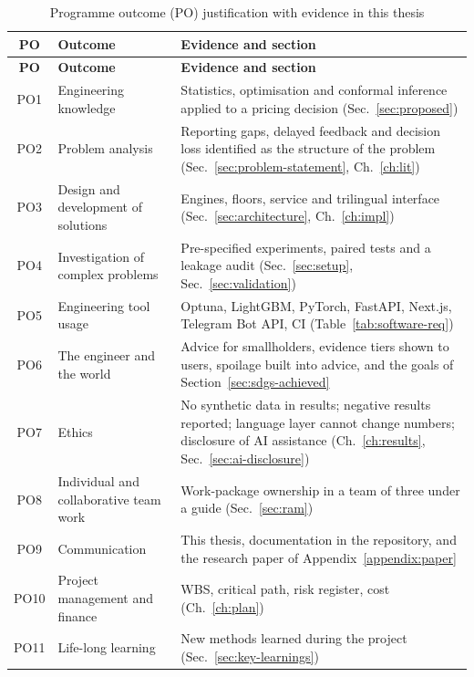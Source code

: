 {\small
\begin{longtable}{|c|p{4.6cm}|p{7.6cm}|}
\caption{Programme outcome (PO) justification with evidence in this thesis}\label{tab:po}\\
\hline
\textbf{PO} & \textbf{Outcome} & \textbf{Evidence and section} \\ \hline
\endfirsthead
\hline
\textbf{PO} & \textbf{Outcome} & \textbf{Evidence and section} \\ \hline
\endhead
PO1 & Engineering knowledge & Statistics, optimisation and conformal inference applied to a pricing decision (Sec.~\ref{sec:proposed}) \\ \hline
PO2 & Problem analysis & Reporting gaps, delayed feedback and decision loss identified as the structure of the problem (Sec.~\ref{sec:problem-statement}, Ch.~\ref{ch:lit}) \\ \hline
PO3 & Design and development of solutions & Engines, floors, service and trilingual interface (Sec.~\ref{sec:architecture}, Ch.~\ref{ch:impl}) \\ \hline
PO4 & Investigation of complex problems & Pre-specified experiments, paired tests and a leakage audit (Sec.~\ref{sec:setup}, Sec.~\ref{sec:validation}) \\ \hline
PO5 & Engineering tool usage & Optuna, LightGBM, PyTorch, FastAPI, Next.js, Telegram Bot API, CI (Table~\ref{tab:software-req}) \\ \hline
PO6 & The engineer and the world & Advice for smallholders, evidence tiers shown to users, spoilage built into advice, and the goals of Section~\ref{sec:sdgs-achieved} \\ \hline
PO7 & Ethics & No synthetic data in results; negative results reported; language layer cannot change numbers; disclosure of AI assistance (Ch.~\ref{ch:results}, Sec.~\ref{sec:ai-disclosure}) \\ \hline
PO8 & Individual and collaborative team work & Work-package ownership in a team of three under a guide (Sec.~\ref{sec:ram}) \\ \hline
PO9 & Communication & This thesis, documentation in the repository, and the research paper of Appendix~\ref{appendix:paper} \\ \hline
PO10 & Project management and finance & WBS, critical path, risk register, cost (Ch.~\ref{ch:plan}) \\ \hline
PO11 & Life-long learning & New methods learned during the project (Sec.~\ref{sec:key-learnings}) \\ \hline
\end{longtable}
}

